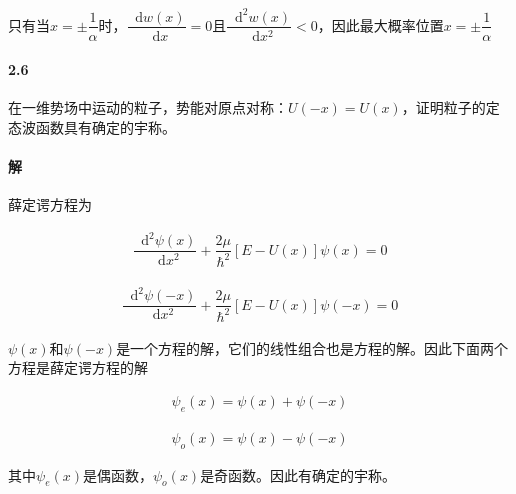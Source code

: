 \documentclass{article}
\newcommand*{\md}{\mathop{}\!\mathrm{d}}
\begin{document}
只有当$x=\pm \dfrac{1}{\alpha} $时，$\dfrac{\md w \left( x \right)}{\md x} = 0$且$\dfrac{\md^2 w \left( x \right)}{\md x^2} < 0 $，因此最大概率位置$x=\pm \dfrac{1}{\alpha} $

\paragraph{2.6}

在一维势场中运动的粒子，势能对原点对称：$U \left( - x \right) = U \left( x \right)$，证明粒子的定态波函数具有确定的宇称。

\paragraph{解}

薛定谔方程为

\begin{equation*}
  \begin{aligned}
    \dfrac{\md^2 \psi \left( x \right)}{\md x^2} + \dfrac{2 \mu}{\hbar^2} \left[ E - U \left( x \right) \right] \psi \left( x \right) = 0  
  \end{aligned}
\end{equation*}

\begin{equation*}
  \begin{aligned}
    \dfrac{\md^2 \psi \left( -x \right)}{\md x^2} + \dfrac{2 \mu}{\hbar^2} \left[ E - U \left( x \right) \right] \psi \left( -x \right) = 0  
  \end{aligned}
\end{equation*}

$\psi \left( x \right)$和$\psi \left( -x \right)$是一个方程的解，它们的线性组合也是方程的解。因此下面两个方程是薛定谔方程的解

\begin{equation*}
  \begin{aligned}
    \psi_e \left( x \right) = \psi \left( x \right) + \psi \left( -x \right)
  \end{aligned}
\end{equation*}

\begin{equation*}
  \begin{aligned}
    \psi_o \left( x \right) = \psi \left( x \right) - \psi \left( -x \right)
  \end{aligned}
\end{equation*}

其中$\psi_e \left( x \right)$是偶函数，$\psi_o \left( x \right)$是奇函数。因此有确定的宇称。
\end{document}
